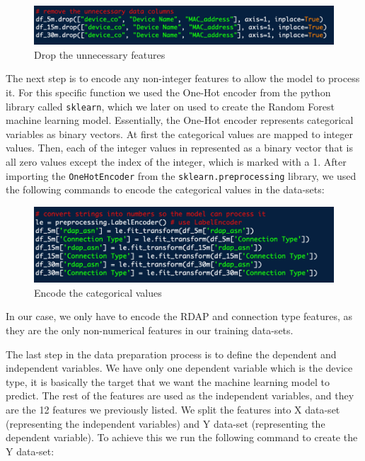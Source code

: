 \documentclass{article}
\begin{document}
\begin{figure}[!ht]
    \centering
    \includegraphics[width=13cm]{MLgraphs/dropunimportantfeatures.png}
    \caption{Drop the unnecessary features} 
\end{figure}

The next step is to encode any non-integer features to allow the model to process it. For this specific function we used the One-Hot encoder from the python library called \texttt{sklearn}, which we later on used to create the Random Forest machine learning model. Essentially, the One-Hot encoder represents categorical variables as binary vectors. At first the categorical values are mapped to integer values. Then, each of the integer values in represented as a binary vector that is all zero values except the index of the integer, which is marked with a 1. After importing the \texttt{OneHotEncoder} from the \texttt{sklearn.preprocessing} library, we used the following commands to encode the categorical values in the data-sets:\newline

\begin{figure}[!ht]
    \centering
    \includegraphics[width=13cm]{MLgraphs/encodecategorical.png}
    \caption{Encode the categorical values} 
\end{figure}

In our case, we only have to encode the RDAP and connection type features, as they are the only non-numerical features in our training data-sets.\newline 

The last step in the data preparation process is to define the dependent and independent variables. We have only one dependent variable which is the device type, it is basically the target that we want the machine learning model to predict. The rest of the features are used as the independent variables, and they are the 12 features we previously listed. We split the features into X data-set (representing the independent variables) and Y data-set (representing the dependent variable). To achieve this we run the following command to create the Y data-set:\newline
\end{document}
